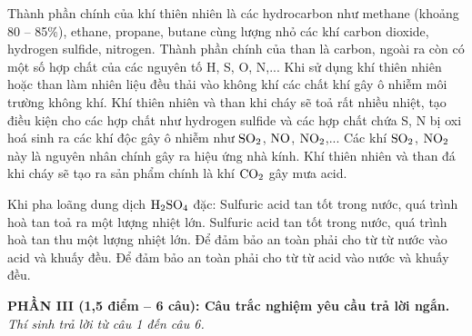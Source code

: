 \documentclass[12pt,a4paper]{article}
\begin{document}
\begin{ex}
Thành phần chính của khí thiên nhiên là các hydrocarbon như methane (khoảng 80 -- 85\%), ethane, propane, butane cùng lượng nhỏ các khí carbon dioxide, hydrogen sulfide, nitrogen. Thành phần chính của than là carbon, ngoài ra còn có một số hợp chất của các nguyên tố H, S, O, N,...
\choiceTF
{\True Khi sử dụng khí thiên nhiên hoặc than làm nhiên liệu đều thải vào không khí các chất khí gây ô nhiễm môi trường không khí.}
{\True Khí thiên nhiên và than khi cháy sẽ toả rất nhiều nhiệt, tạo điều kiện cho các hợp chất như hydrogen sulfide và các hợp chất chứa S, N bị oxi hoá sinh ra các khí độc gây ô nhiễm như $\ce{SO2}$, $\ce{NO}$, $\ce{NO2}$,...}
{Các khí $\ce{SO2}$, $\ce{NO2}$ này là nguyên nhân chính gây ra hiệu ứng nhà kính.}
{Khí thiên nhiên và than đá khi cháy sẽ tạo ra sản phẩm chính là khí $\ce{CO2}$ gây mưa acid.}
\end{ex}

\begin{ex}
Khi pha loãng dung dịch $\ce{H2SO4}$ đặc:
\choiceTF
{\True Sulfuric acid tan tốt trong nước, quá trình hoà tan toả ra một lượng nhiệt lớn.}
{Sulfuric acid tan tốt trong nước, quá trình hoà tan thu một lượng nhiệt lớn.}
{Để đảm bảo an toàn phải cho từ từ nước vào acid và khuấy đều.}
{\True Để đảm bảo an toàn phải cho từ từ acid vào nước và khuấy đều.}
\end{ex}

\bigskip
\noindent
\textbf{PHẦN III (1,5 điểm -- 6 câu): Câu trắc nghiệm yêu cầu trả lời ngắn.}\\
\textit{Thí sinh trả lời từ câu 1 đến câu 6.}
\end{document}

